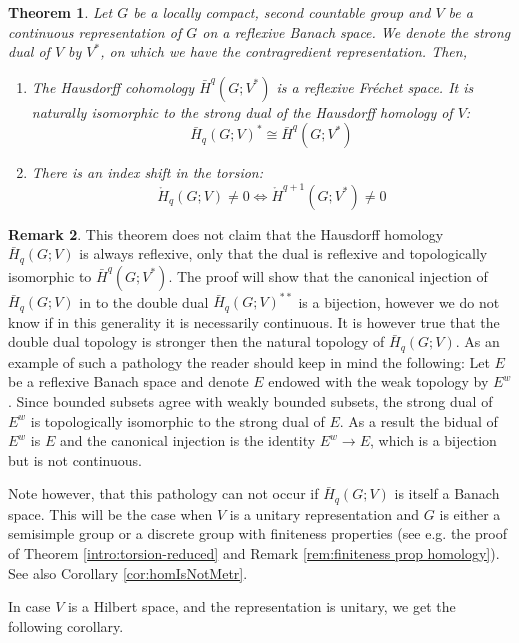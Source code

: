 \documentclass[12pt,reqno]{amsart}
\newtheorem{theorem}{Theorem}[section]
\theoremstyle{definition}
\newtheorem{remark}[theorem]{Remark}
\begin{document}
\begin{theorem}\label{thm:indexShift}
    Let $G$ be a locally compact, second countable group and $V$ be a continuous representation of $G$ on a reflexive Banach space. We denote the strong dual of $V$ by $V^*$, on which we have the contragredient representation. Then,
    \begin{enumerate}
        \item The Hausdorff cohomology $\bar{H}^q(G;V^*)$ is a reflexive Fr\'echet space. It is naturally isomorphic to the strong dual of the Hausdorff homology of $V$:
        $$\bar{H}_q(G;V)^* \cong \bar{H}^q(G;V^*)$$
        \item There is an index shift in the torsion:
        $$\mathring{H}_q(G;V) \ne 0 \iff \mathring{H}^{q+1}(G;V^*) \ne 0$$
    \end{enumerate}
\end{theorem}

\begin{remark}
    This theorem does not claim that the Hausdorff homology $\bar{H}_q(G;V)$ is always reflexive, only that the dual is reflexive and topologically isomorphic to $\bar{H}^q(G;V^*)$. The proof will show that the canonical injection of $\bar{H}_q(G;V)$ in to the double dual $\bar{H}_q(G;V)^{**}$ is a bijection, however we do not know if in this generality it is necessarily continuous. It is however true that the double dual topology is stronger then the natural topology of $\bar{H}_q(G;V)$. As an example of such a pathology the reader should keep in mind the following: Let $E$ be a reflexive Banach space and denote $E$ endowed with the weak topology by $E^w$. Since bounded subsets agree with weakly bounded subsets, the strong dual of $E^w$ is topologically isomorphic to the strong dual of $E$. As a result the bidual of $E^w$ is $E$ and the canonical injection is the identity $E^w \to E$, which is a bijection but is not continuous.
    
    Note however, that this pathology can not occur if $\bar{H}_q(G;V)$ is itself a Banach space. This will be the case when $V$ is a unitary representation and $G$ is either a semisimple group or a discrete group with finiteness properties (see e.g. the proof of Theorem \ref{intro:torsion-reduced} and Remark \ref{rem:finiteness prop homology}). See also Corollary \ref{cor:homIsNotMetr}.

    
\end{remark}

In case $V$ is a Hilbert space, and the representation is unitary, we get the following corollary.
\end{document}
